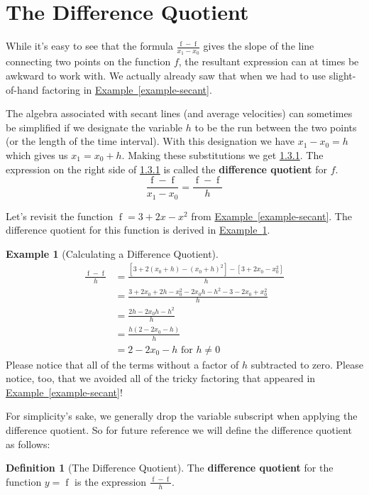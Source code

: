 \documentclass[12pt,]{book}
\newcommand{\terminology}[1]{\textbf{#1}}
\theoremstyle{plain}
\theoremstyle{definition}
\newtheorem{definition}[theorem]{Definition}
\newtheorem{example}[theorem]{Example}
\numberwithin{equation}{section}
\newcommand{\fe}[2]{\mathop{{#1}{\left(#2\right)}}}
\begin{document}
\section[The Difference Quotient]{The Difference Quotient}\label{section-difference-quotient}
While it's easy to see that the formula \(\frac{\fe{f}{x_1}-\fe{f}{x_1}}{x_1-x_0}\) gives the slope of the line connecting two points on the function \(f\), the resultant expression can at times be awkward to work with. We actually already saw that when we had to use slight-of-hand factoring in \hyperref[example-secant]{Example~\ref*{example-secant}}.%
\par
The algebra associated with secant lines (and average velocities) can sometimes be simplified if we designate the variable \(h\) to be the run between the two points (or the length of the time interval). With this designation we have \(x_1-x_0=h\) which gives us \(x_1=x_0+h\). Making these substitutions we get \hyperref[equation-difference-quotient]{1.3.1}. The expression on the right side of \hyperref[equation-difference-quotient]{1.3.1} is called the \terminology{difference quotient} for \(f\).%
\begin{equation}\frac{\fe{f}{x_1}-\fe{f}{x_1}}{x_1-x_0}=\frac{\fe{f}{x_0+h}-\fe{f}{x_1}}{h}\label{equation-difference-quotient}\end{equation}\par
Let's revisit the function \(\fe{f}{x}=3+2x-x^2\) from \hyperref[example-secant]{Example~\ref*{example-secant}}. The difference quotient for this function is derived in \hyperref[example-difference-quotient]{Example~\ref*{example-difference-quotient}}.%
\begin{example}[Calculating a Difference Quotient]\label{example-difference-quotient}
\begin{align*}
\frac{\fe{f}{x_0+h}-\fe{f}{x_0}}{h}&=\frac{\left[3+2\left(x_0+h\right)-\left(x_0+h\right)^2\right]-\left[3+2x_0-x_0^2\right]}{h}\\
&=\frac{3+2x_0+2h-x_0^2-2x_0h-h^2-3-2x_0+x_0^2}{h}\\
&=\frac{2h-2x_0h-h^2}{h}\\
&=\frac{h\left(2-2x_0-h\right)}{h}\\
&=2-2x_0-h\text{ for }h\neq 0
\end{align*}Please notice that all of the terms without a factor of \(h\) subtracted to zero. Please notice, too, that we avoided all of the tricky factoring that appeared in \hyperref[example-secant]{Example~\ref*{example-secant}}!%
\end{example}
\par
For simplicity's sake, we generally drop the variable subscript when applying the difference quotient. So for future reference we will define the difference quotient as follows:%
\begin{definition}[The Difference Quotient]\label{definition-difference-quotient}
The \terminology{difference quotient} for the function \(y=\fe{f}{x}\) is the expression \(\frac{\fe{f}{x+h}-\fe{f}{x}}{h}\).%
\end{definition}
\typeout{************************************************}
\typeout{************************************************}
\end{document}
